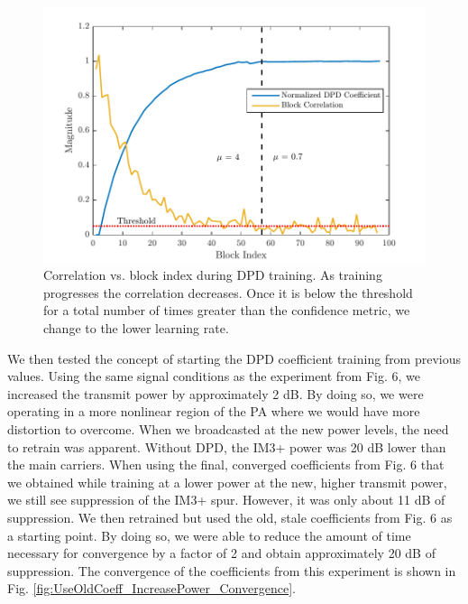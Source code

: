 \begin{figure}[t!] 
\centering
\includegraphics[width=0.9\columnwidth]{Figures/Convergence_Mu}
\caption{Correlation vs. block index during DPD training. As training progresses the correlation decreases. Once it is below the threshold for a total number of times greater than the confidence metric, we change to the lower learning rate.}
\label{fig:Convergence_Mu}
\vspace{-10pt}
\end{figure}

We then tested the concept of starting the DPD coefficient training from previous values. Using the same signal conditions as the experiment from Fig. 6, we increased the transmit power by approximately 2 dB. By doing so, we were operating in a more nonlinear region of the PA where we would have more distortion to overcome. When we broadcasted at the new power levels, the need to retrain was apparent. Without DPD, the IM3+ power was 20 dB lower than the main carriers. When using the final, converged coefficients from Fig. 6 that we obtained while training at a lower power at the new, higher transmit power, we still see suppression of the IM3+ spur. However, it was only about 11 dB of suppression. We then retrained but used the old, stale coefficients from Fig. 6 as a starting point. By doing so, we were able to reduce the amount of time necessary for convergence by a factor of 2 and obtain approximately 20 dB of suppression. The convergence of the coefficients from this experiment is shown in Fig. \ref{fig:UseOldCoeff_IncreasePower_Convergence}. 

